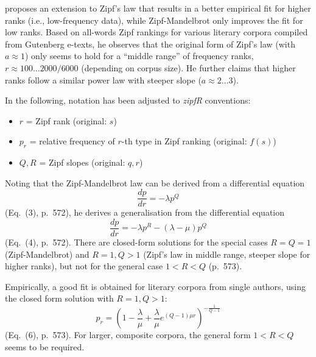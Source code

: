 \documentclass[a4paper]{article}
\begin{document}
\citet{Montemurro:01} proposes an extension to Zipf's law that results in a better empirical fit for higher ranks (i.e., low-frequency data), while Zipf-Mandelbrot only improves the fit for low ranks.  Based on all-words Zipf rankings for various literary corpora compiled from Gutenberg e-texts, he observes that the original form of Zipf's law (with $a\approx 1$) only seems to hold for a ``middle range'' of frequency ranks, $r\approx 100 \ldots 2000 / 6000$ (depending on corpus size).  He further claims that higher ranks follow a similar power law with steeper slope ($a \approx 2 \ldots 3$).

In the following, notation has been adjusted to \emph{zipfR} conventions:
\begin{itemize}
\item $r$ = Zipf rank (original: $s$)
\item $p_r$ = relative frequency of $r$-th type in Zipf ranking (original: $f(s)$)
\item $Q, R$ = Zipf slopes (original: $q, r$) 
\end{itemize}

Noting that the Zipf-Mandelbrot law can be derived from a differential equation
\begin{equation}
  \label{eq:lit:ext:Montemurro2001:1}
  \frac{dp}{dr} = -\lambda p^Q
\end{equation}
(Eq.~(3), p.~572), he derives a generalisation from the differential equation
\begin{equation}
  \label{eq:lit:ext:Montemurro2001:2}
  \frac{dp}{dr} = -\lambda p^R - (\lambda - \mu) p^Q
\end{equation}
(Eq.~(4), p.~572).  There are closed-form solutions for the special cases $R = Q = 1$ (Zipf-Mandelbrot) and $R = 1, Q > 1$ (Zipf's law in middle range, steeper slope for higher ranks), but not for the general case $1 < R < Q$ (p.~573).  

Empirically, a good fit is obtained for literary corpora from single authors, using the closed form solution with $R = 1, Q > 1$:
\begin{equation}
  \label{eq:lit:ext:Montemurro2001:3}
  p_r = \left( 1 - \frac{\lambda}{\mu} + \frac{\lambda}{\mu} e^{(Q-1) \mu r} \right)^{-\frac1{Q-1}}
\end{equation}
(Eq.~(6), p.~573).  For larger, composite corpora, the general form $1 < R < Q$ seems to be required.
\end{document}
